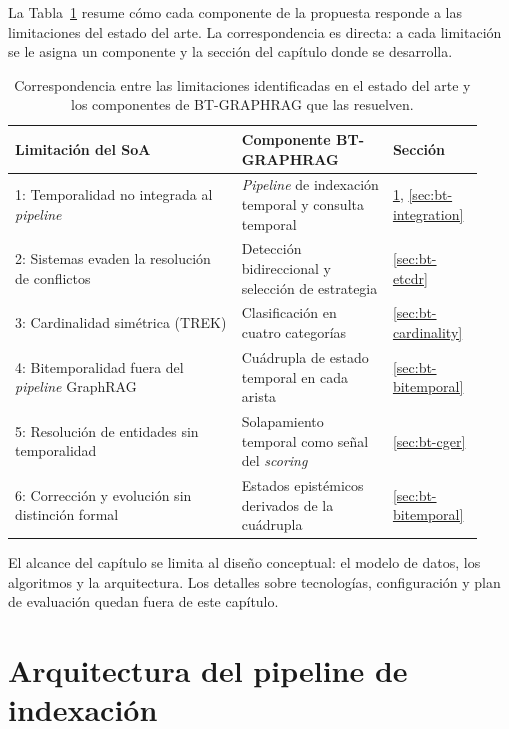 
La Tabla~\ref{tab:limitations-to-components} resume cómo cada componente de la propuesta responde a las limitaciones del estado del arte. La correspondencia es directa: a cada limitación se le asigna un componente y la sección del capítulo donde se desarrolla.

\begin{table}[h]
\centering
\small
\begin{tabular}{p{0.45\linewidth}p{0.30\linewidth}p{0.18\linewidth}}
\hline
\textbf{Limitación del SoA} & \textbf{Componente BT-GRAPHRAG} & \textbf{Sección} \\ \hline
1: Temporalidad no integrada al \emph{pipeline} & \emph{Pipeline} de indexación temporal y consulta temporal & \ref{sec:bt-pipeline}, \ref{sec:bt-integration} \\
2: Sistemas evaden la resolución de conflictos & Detección bidireccional y selección de estrategia & \ref{sec:bt-etcdr} \\
3: Cardinalidad simétrica (TREK) & Clasificación en cuatro categorías & \ref{sec:bt-cardinality} \\
4: Bitemporalidad fuera del \emph{pipeline} GraphRAG & Cuádrupla de estado temporal en cada arista & \ref{sec:bt-bitemporal} \\
5: Resolución de entidades sin temporalidad & Solapamiento temporal como señal del \emph{scoring} & \ref{sec:bt-cger} \\
6: Corrección y evolución sin distinción formal & Estados epistémicos derivados de la cuádrupla & \ref{sec:bt-bitemporal} \\ \hline
\end{tabular}
\caption{Correspondencia entre las limitaciones identificadas en el estado del arte y los componentes de BT-GRAPHRAG que las resuelven.}
\label{tab:limitations-to-components}
\end{table}

El alcance del capítulo se limita al diseño conceptual: el modelo de datos, los algoritmos y la arquitectura. Los detalles sobre tecnologías, configuración y plan de evaluación quedan fuera de este capítulo.

\section{Arquitectura del pipeline de indexación}\label{sec:bt-pipeline}

